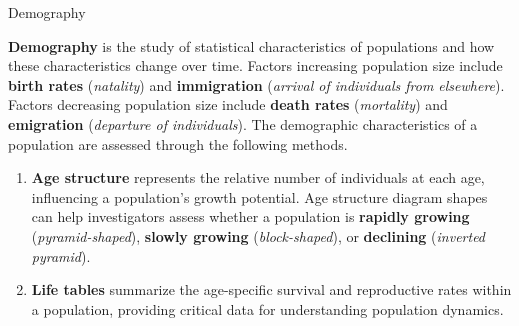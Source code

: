\documentclass[10pt]{article}
\begin{document}
  \begin{core}{Demography}

    \textbf{Demography} is the study of statistical characteristics of populations and how these characteristics change over time. Factors increasing population size include \textbf{birth rates} (\textit{natality}) and \textbf{immigration} (\textit{arrival of individuals from elsewhere}). Factors decreasing population size include \textbf{death rates} (\textit{mortality}) and \textbf{emigration} (\textit{departure of individuals}). The demographic characteristics of a population are assessed through the following methods.

    \begin{enumerate}


      \item \textbf{Age structure} represents the relative number of individuals at each age, influencing a population's growth potential. Age structure diagram shapes can help investigators assess whether a population is \textbf{rapidly growing} (\textit{pyramid-shaped}), \textbf{slowly growing} (\textit{block-shaped}), or \textbf{declining} (\textit{inverted pyramid}).


      \item \textbf{Life tables} summarize the age-specific survival and reproductive rates within a population, providing critical data for understanding population dynamics.


\end{enumerate}
\end{core}
\end{document}
